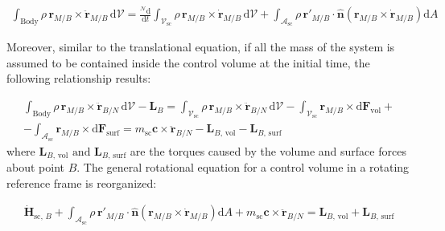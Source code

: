 \begin{multline}
	\int_{\text{Body}}  \rho\,\bm{r}_{M/B} \times \ddot{\bm{r}}_{M/B}\,\text{d}\mathcal{V}  = \frac{^\mathcal{N}\text{d}}{\text{d}t} \int_{\mathcal{V}_{\text{sc}}} \rho\,\bm{r}_{M/B} \times \dot{\bm{r}}_{M/B}\,\text{d}\mathcal{V} + \int_{\mathcal{A}_{\text{sc}}} \rho\,\bm{r}'_{M/B} \cdot\bm{\hat{n}} \left(\bm{r}_{M/B} \times \dot{\bm{r}}_{M/B}\right)\text{d}A
\end{multline} 

Moreover, similar to the translational equation, if all the mass of the system is assumed to be contained inside the control volume at the initial time, the following relationship results:

\begin{multline}
	\int_{\text{Body}} \rho\,\bm{r}_{M/B} \times \ddot{\bm{r}}_{B/N}\,\text{d}\mathcal{V} -  \bm{L}_{B}=  \int_{\mathcal{V}_{\text{sc}}} \rho\,\bm{r}_{M/B} \times \ddot{\bm{r}}_{B/N}\,\text{d}\mathcal{V} -  \int_{\mathcal{V}_{\text{sc}}}\bm{r}_{M/B} \times \text{d}\bm{F}_{\text{vol}} +\\- \int_{\mathcal{A}_{\text{sc}}} \bm{r}_{M/B} \times\text{d}\bm{F}_{\text{surf}} = {m}_{\text{sc}} \bm{c} \times \ddot{\bm{r}}_{B/N}-\bm{L}_{B,\,\text{vol}}-\bm{L}_{B,\,\text{surf}}
\end{multline}
\noindent
where $\bm{L}_{B,\,\text{vol}}\text{ and }\bm{L}_{B,\,\text{surf}}$ are the torques caused by the volume and surface forces about point $B$. The general rotational equation for a control volume in a rotating reference frame is reorganized:

\begin{multline}\label{eq:eq36}
	\dot{\bm{H}}_{\text{sc, }B} + \int_{\mathcal{A}_{\text{sc}}} \rho\,\bm{r}'_{M/B} \cdot\bm{\hat{n}} \left(\bm{r}_{M/B} \times \dot{\bm{r}}_{M/B}\right)\text{d}A +{m}_{\text{sc}} \bm{c} \times \ddot{\bm{r}}_{B/N}=\bm{L}_{B,\,\text{vol}}+\bm{L}_{B,\,\text{surf}}
\end{multline}

